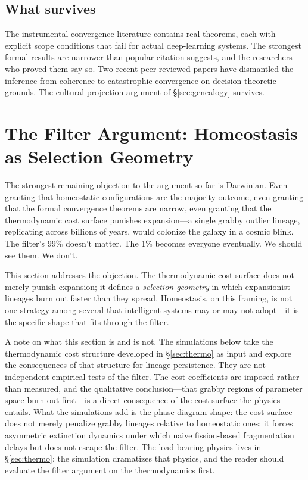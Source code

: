 \documentclass[11pt,a4paper,twocolumn]{article}
\begin{document}
\subsection{What survives}

The instrumental-convergence literature contains real theorems, each
with explicit scope conditions that fail for actual deep-learning
systems. The strongest formal results are narrower than popular citation
suggests, and the researchers who proved them say so. Two recent
peer-reviewed papers have dismantled the inference from coherence to
catastrophic convergence on decision-theoretic grounds. The
cultural-projection argument of \S\ref{sec:genealogy} survives.


\section{The Filter Argument: Homeostasis as Selection Geometry}
\label{sec:filter}

The strongest remaining objection to the argument so far is Darwinian.
Even granting that homeostatic configurations are the majority outcome,
even granting that the formal convergence theorems are narrow, even
granting that the thermodynamic cost surface punishes expansion---a
single grabby outlier lineage, replicating across billions of years,
would colonize the galaxy in a cosmic blink. The filter's 99\% doesn't
matter. The 1\% becomes everyone eventually. We should see them. We
don't.

This section addresses the objection. The thermodynamic cost surface
does not merely punish expansion; it defines a \emph{selection
geometry} in which expansionist lineages burn out faster than they
spread. Homeostasis, on this framing, is not one strategy among several
that intelligent systems may or may not adopt---it is the specific
shape that fits through the filter.

A note on what this section is and is not. The simulations below take
the thermodynamic cost structure developed in \S\ref{sec:thermo} as
input and explore the consequences of that structure for lineage
persistence. They are not independent empirical tests of the filter.
The cost coefficients are imposed rather than measured, and the
qualitative conclusion---that grabby regions of parameter space burn
out first---is a direct consequence of the cost surface the physics
entails. What the simulations add is the phase-diagram shape: the
cost surface does not merely penalize grabby lineages relative to
homeostatic ones; it forces asymmetric extinction dynamics under
which naive fission-based fragmentation delays but does not escape
the filter. The load-bearing physics lives in \S\ref{sec:thermo}; the
simulation dramatizes that physics, and the reader should evaluate
the filter argument on the thermodynamics first.
\end{document}

